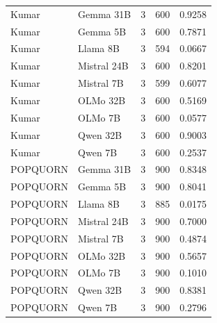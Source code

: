 \begin{table}[t]
\begin{tabular}{llrrl}
Kumar & Gemma 31B & 3 & 600 & 0.9258 \\
Kumar & Gemma 5B & 3 & 600 & 0.7871 \\
Kumar & Llama 8B & 3 & 594 & 0.0667 \\
Kumar & Mistral 24B & 3 & 600 & 0.8201 \\
Kumar & Mistral 7B & 3 & 599 & 0.6077 \\
Kumar & OLMo 32B & 3 & 600 & 0.5169 \\
Kumar & OLMo 7B & 3 & 600 & 0.0577 \\
Kumar & Qwen 32B & 3 & 600 & 0.9003 \\
Kumar & Qwen 7B & 3 & 600 & 0.2537 \\
POPQUORN & Gemma 31B & 3 & 900 & 0.8348 \\
POPQUORN & Gemma 5B & 3 & 900 & 0.8041 \\
POPQUORN & Llama 8B & 3 & 885 & 0.0175 \\
POPQUORN & Mistral 24B & 3 & 900 & 0.7000 \\
POPQUORN & Mistral 7B & 3 & 900 & 0.4874 \\
POPQUORN & OLMo 32B & 3 & 900 & 0.5657 \\
POPQUORN & OLMo 7B & 3 & 900 & 0.1010 \\
POPQUORN & Qwen 32B & 3 & 900 & 0.8381 \\
POPQUORN & Qwen 7B & 3 & 900 & 0.2796 \\
\bottomrule
\end{tabular}
\end{table}
